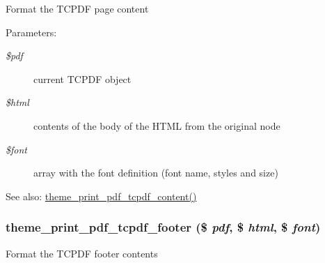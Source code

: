 Format the TCPDF page content

\begin{Desc}
\item[Parameters:]
\begin{description}
\item[{\em \$pdf}]current TCPDF object \item[{\em \$html}]contents of the body of the HTML from the original node \item[{\em \$font}]array with the font definition (font name, styles and size) \end{description}
\end{Desc}
\begin{Desc}
\item[See also:]\hyperlink{print__pdf_8pages_8inc_940cf9ed2d75d587a14285aec0f01f35}{theme\_\-print\_\-pdf\_\-tcpdf\_\-content()} \end{Desc}
\hypertarget{print__pdf_8pages_8inc_25f419982a26a07b6a35d7756a432b4e}{
\subsubsection[{theme\_\-print\_\-pdf\_\-tcpdf\_\-footer}]{\setlength{\rightskip}{0pt plus 5cm}theme\_\-print\_\-pdf\_\-tcpdf\_\-footer (\$ {\em pdf}, \/  \$ {\em html}, \/  \$ {\em font})}}
\label{print__pdf_8pages_8inc_25f419982a26a07b6a35d7756a432b4e}


Format the TCPDF footer contents

